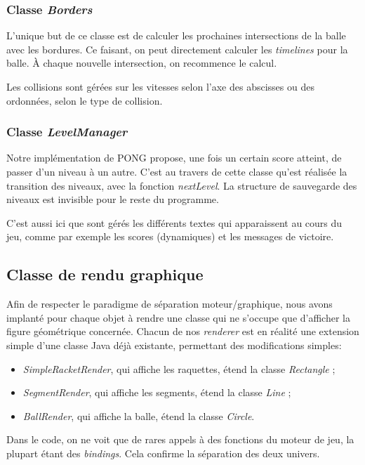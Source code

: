 \documentclass[a4paper,10pt]{article}
\theoremstyle{definition}
\begin{document}
        \subsubsection*{Classe \emph{Borders}}
        L'unique but de ce classe est de calculer les prochaines intersections de la balle avec les bordures. Ce faisant, on peut directement calculer les \emph{timelines} pour la balle. À chaque nouvelle intersection, on recommence le calcul.
        
        Les collisions sont gérées sur les vitesses selon l'axe des abscisses ou des ordonnées, selon le type de collision.
        
        \subsubsection*{Classe \emph{LevelManager}}
        Notre implémentation de PONG propose, une fois un certain score atteint, de passer d'un niveau à un autre. C'est au travers de cette classe qu'est réalisée la transition des niveaux, avec la fonction \emph{nextLevel}. La structure de sauvegarde des niveaux est invisible pour le reste du programme.
        
        C'est aussi ici que sont gérés les différents textes qui apparaissent au cours du jeu, comme par exemple les scores (dynamiques) et les messages de victoire.
        
    \subsection{Classe de rendu graphique}
    Afin de respecter le paradigme de séparation moteur/graphique, nous avons implanté pour chaque objet à rendre une classe qui ne s'occupe que d'afficher la figure géométrique concernée. Chacun de nos \emph{renderer} est en réalité une extension simple d'une classe Java déjà existante, permettant des modifications simples:
    
    \begin{itemize}
      \item \emph{SimpleRacketRender}, qui affiche les raquettes, étend la classe \emph{Rectangle} ;
      \item \emph{SegmentRender}, qui affiche les segments, étend la classe \emph{Line} ;
      \item \emph{BallRender}, qui affiche la balle, étend la classe \emph{Circle}.
    \end{itemize}
    Dans le code, on ne voit que de rares appels à des fonctions du moteur de jeu, la plupart étant des \emph{bindings}. Cela confirme la séparation des deux univers.
    
\end{document}
